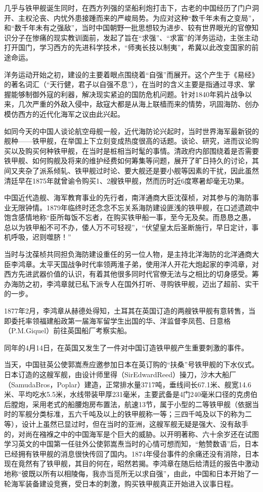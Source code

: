 \documentclass[12pt,UTF8]{ctexbook}
\begin{document}
几乎与铁甲舰诞生同时，在西方列强的坚船利炮打击下，古老的中国经历了门户洞开、主权沦丧、内忧外患接踵而来的严峻局势。为应对这种“数千年未有之变局”，和“数千年未有之强敌”，当时中国朝野一批思想较为进步、较有世界眼光的官僚知识分子在惨痛的现实教训面前，发起了旨在“求强”、“求富”的洋务运动，主张主动打开国门，学习西方的先进科学技术，“师夷长技以制夷”，希冀以此改变国家的前途命运。

洋务运动开始之初，建设的主要着眼点围绕着“自强”而展开。这个产生于《易经》的著名词汇（“天行健，君子以自强不息”），在当时的含义主要是指通过寻求、掌握能够制御外寇的利器，解决现实紧迫的国防危机问题。针对1840年鸦片战争以来，几次严重的外敌入侵中，敌寇大都是从海上联樯而来的情势，巩固海防、创办模仿西方的近代化海军之议由此兴起。

如同今天的中国人谈论航空母舰一般，近代海防论兴起时，当时世界海军最新锐的舰种——铁甲舰，在举国上下立刻变成热度很高的话题。谈论、研究，进而议论购买以及购买何种铁甲舰，在当时是桩相当时髦的事情。清政府内部围绕着是否需要铁甲舰、如何购舰及将来的维护经费如何筹集等问题，展开了旷日持久的讨论，其间又夹杂了派系倾轧、铁甲舰过时论、要大舰还是要小舰等因素的干扰，因此虽然清廷早在1875年就曾谕令购买1、2艘铁甲舰，然而历时近6度寒暑却毫无功果。

中国近代造舰、海军教育事业的先行者，南洋通商大臣沈葆桢，对其参与的海防事业无限钟情。1879年临终时还念念不忘关系海防建设匪浅的铁甲舰，在口述遗疏中饱含感情地称“臣所每饭不忘者，在购买铁甲船一事，至今无及矣。而恳恳之愚，总以为铁甲船不可不办，倭人万不可轻视”，“伏望皇太后圣断施行，早日定计，事机呼吸，迟则噬脐！”

当时与沈葆桢共同担负海防建设重任的另一位人物，是主持北洋海防的北洋通商大臣李鸿章。太平天国战争时代率领两淮子弟，使用洋人开花大炮起家的李鸿章，对西方先进武器价值的认识，有着其他很多同时代官僚无法与之相比的切身感受。筹办海防之初，李鸿章就已私下派专人在国外打听、寻购铁甲舰，迈出了超前、实干的一步。

1877年2月，李鸿章从赫德处得知，土耳其在英国订造的两艘铁甲舰有意转售，当即委托率领福建船政第一届海军留学生出国的华、洋监督李凤苞、日意格（P.M.Giquel）前往英国船厂考察实船。

同年的4月14日，在英国又发生了一件对中国订造铁甲舰产生重要刺激的事件。

当天，中国驻英公使郭嵩焘应邀参加日本在英订购的“扶桑”号铁甲舰的下水仪式。日本订造的这艘军舰，由设计师里得（SirEdwardReed）操刀，沙木大船厂（SamudaBros，Poplar）建造，正常排水量3717吨，垂线间长67.1米、舰宽14.6米、平均吃水5.5米，水线带装甲厚231毫米，主要武备是4门240毫米口径的克虏伯后膛炮，采用老式的船腰炮房布置法，航速13节，属于小型的二等铁甲舰（依据当时的军舰分类标准，五六千吨及以上的铁甲舰称一等；三四千吨及以下的称为二等），设计上虽然已显过时，但在当时的亚洲，这艘军舰无疑是强大、没有敌手的，对尚在襁褓之中的中国海军是个巨大的威胁。以开明著称、六十余岁还在试图学习英文的中国第一任驻外公使郭嵩焘当时的心情可想而知，“勉赞数语”后，日本已经拥有铁甲舰的消息很快传回了国内。1874年侵台事件的余痛还没有消除，日本现在竟然有了铁甲舰，其目的何在，昭然若揭。李鸿章在随后给清廷的报告中激动地称“彼既以所有以相陵侮，我亦当觅所无以求自强”，由此，中国和日本开始了一轮海军装备建设竞赛，受日本的刺激，购买铁甲舰真正开始进入议事日程。
\end{document}
